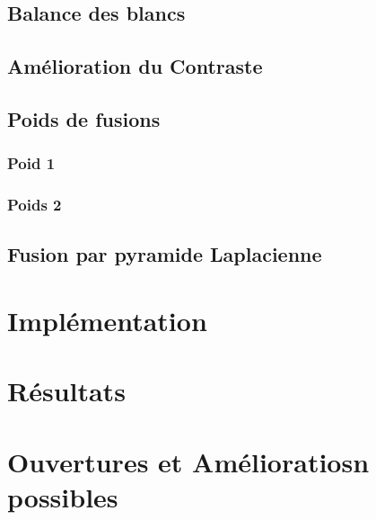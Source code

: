 \documentclass[twoside]{article}
\begin{document}
\begin{multicols}{2}
\subsection{Balance des blancs}

\subsection{Amélioration du Contraste}

\subsection{Poids de fusions}

\subsubsection{Poid 1}

\subsubsection{Poids 2}	

\subsection{Fusion par pyramide Laplacienne}
	
\section{Implémentation}

\section{Résultats}

\section{Ouvertures et Amélioratiosn possibles}


\end{multicols}
\end{document}
